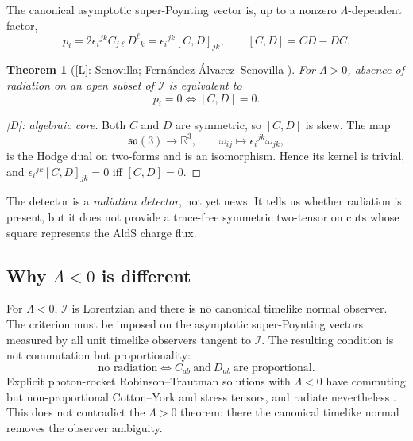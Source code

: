\documentclass[11pt,a4paper]{article}
\newtheorem{theorem}{Theorem}[section]
\newcommand{\scri}{\mathscr{I}}
\newcommand{\statusL}{\textsf{[L]}}
\newcommand{\statusD}{\textsf{[D]}}
\begin{document}
The canonical asymptotic super-Poynting vector is, up to a nonzero \(\Lambda\)-dependent factor,
\begin{equation}\label{eq:p-detector}
  p_i
  =
  2\epsilon_i{}^{jk}C_{j\ell}D^\ell{}_k
  =
  \epsilon_i{}^{jk}[C,D]_{jk},
  \qquad [C,D]=CD-DC .
\end{equation}

\begin{theorem}[\statusL: Senovilla; Fern{\'a}ndez-{\'A}lvarez--Senovilla \cite{senovilla2022radiation,fabSen2020radiation,fabSen2025characterization}]
For \(\Lambda>0\), absence of radiation on an open subset of \(\scri\) is equivalent to
\begin{equation}
  p_i=0
  \iff
  [C,D]=0 .
\end{equation}
\end{theorem}

\begin{proof}[\statusD: algebraic core]
Both \(C\) and \(D\) are symmetric, so \([C,D]\) is skew.  The map
\begin{equation}
  \mathfrak{so}(3)\to\mathbb{R}^3,
  \qquad
  \omega_{ij}\mapsto \epsilon_i{}^{jk}\omega_{jk},
\end{equation}
is the Hodge dual on two-forms and is an isomorphism.  Hence its kernel is trivial, and \(\epsilon_i{}^{jk}[C,D]_{jk}=0\) iff \([C,D]=0\).
\end{proof}

The detector is a \emph{radiation detector}, not yet news.  It tells us whether radiation is present, but it does not provide a trace-free symmetric two-tensor on cuts whose square represents the AldS charge flux.

\subsection{Why \(\Lambda<0\) is different}

For \(\Lambda<0\), \(\scri\) is Lorentzian and there is no canonical timelike normal observer.  The criterion must be imposed on the asymptotic super-Poynting vectors measured by all unit timelike observers tangent to \(\scri\).  The resulting condition is not commutation but proportionality:
\begin{equation}
  \text{no radiation}
  \iff
  C_{ab}\ \text{and}\ D_{ab}\ \text{are proportional}.
\end{equation}
Explicit photon-rocket Robinson--Trautman solutions with \(\Lambda<0\) have commuting but non-proportional Cotton--York and stress tensors, and radiate nevertheless \cite{fabSen2026rockets}.  This does not contradict the \(\Lambda>0\) theorem: there the canonical timelike normal removes the observer ambiguity.
\end{document}
